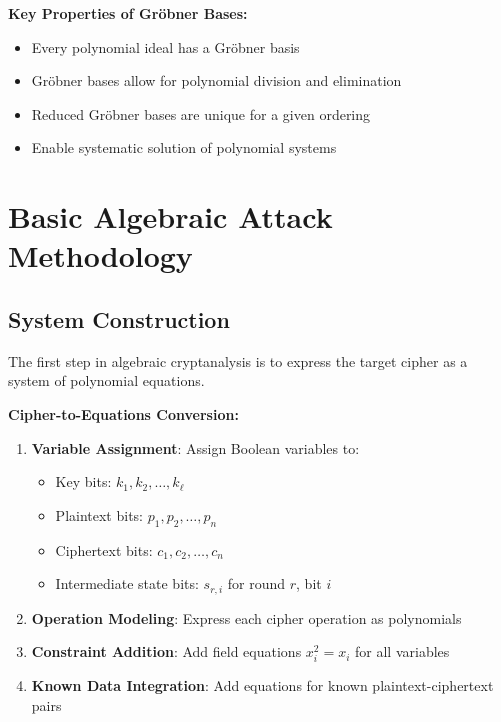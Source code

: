 \documentclass[12pt,a4paper]{article}
\newcommand{\Grobner}{Gr\"{o}bner}
\begin{document}
\begin{mathematicsbox}
\textbf{Key Properties of \Grobner{} Bases:}
\begin{itemize}
    \item Every polynomial ideal has a \Grobner{} basis
    \item \Grobner{} bases allow for polynomial division and elimination
    \item Reduced \Grobner{} bases are unique for a given ordering
    \item Enable systematic solution of polynomial systems
\end{itemize}
\end{mathematicsbox}

\section{Basic Algebraic Attack Methodology}

\subsection{System Construction}

The first step in algebraic cryptanalysis is to express the target cipher as a system of polynomial equations.

\begin{algorithmbox}
\textbf{Cipher-to-Equations Conversion:}
\begin{enumerate}
    \item \textbf{Variable Assignment}: Assign Boolean variables to:
    \begin{itemize}
        \item Key bits: $k_1, k_2, \ldots, k_{\ell}$
        \item Plaintext bits: $p_1, p_2, \ldots, p_n$
        \item Ciphertext bits: $c_1, c_2, \ldots, c_n$
        \item Intermediate state bits: $s_{r,i}$ for round $r$, bit $i$
    \end{itemize}
    \item \textbf{Operation Modeling}: Express each cipher operation as polynomials
    \item \textbf{Constraint Addition}: Add field equations $x_i^2 = x_i$ for all variables
    \item \textbf{Known Data Integration}: Add equations for known plaintext-ciphertext pairs
\end{enumerate}
\end{algorithmbox}
\end{document}

